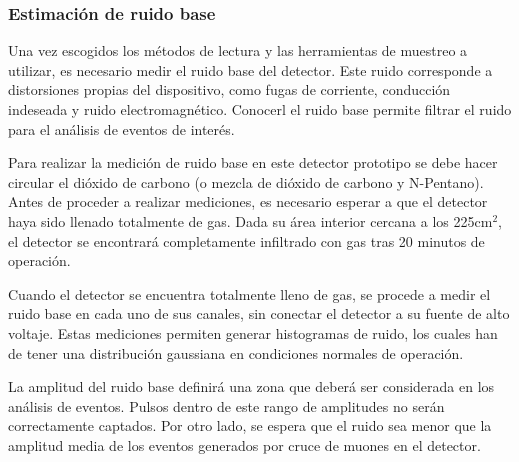 		

	\subsubsection{Estimación de ruido base}
		Una vez escogidos los métodos de lectura y las herramientas de muestreo a utilizar, es necesario medir el ruido base del detector. Este ruido corresponde a distorsiones propias del dispositivo, como fugas de corriente, conducción indeseada y ruido electromagnético. Conocerl el ruido base  permite filtrar el ruido para el análisis de eventos de interés.
		
		Para realizar la medición de ruido base en este detector prototipo se debe hacer circular el dióxido de carbono (o mezcla de dióxido de carbono y N-Pentano). Antes de proceder a realizar mediciones, es necesario esperar a que el detector haya sido llenado totalmente de gas. Dada su área interior cercana a los 225cm$^2$, el detector se encontrará completamente infiltrado con gas tras 20 minutos de operación. 
		
		Cuando el detector se encuentra totalmente lleno de gas, se procede a medir el ruido base en cada uno de sus canales, sin conectar el detector a su fuente de alto voltaje. Estas mediciones permiten generar histogramas de ruido, los cuales han de tener una distribución gaussiana en condiciones normales de operación. 
		
		La amplitud del ruido base definirá una zona que deberá ser considerada en los análisis de eventos. Pulsos dentro de este rango de amplitudes no serán correctamente captados. Por otro lado, se espera que el ruido sea menor que la amplitud media de los eventos generados por cruce de muones en el detector.
		
